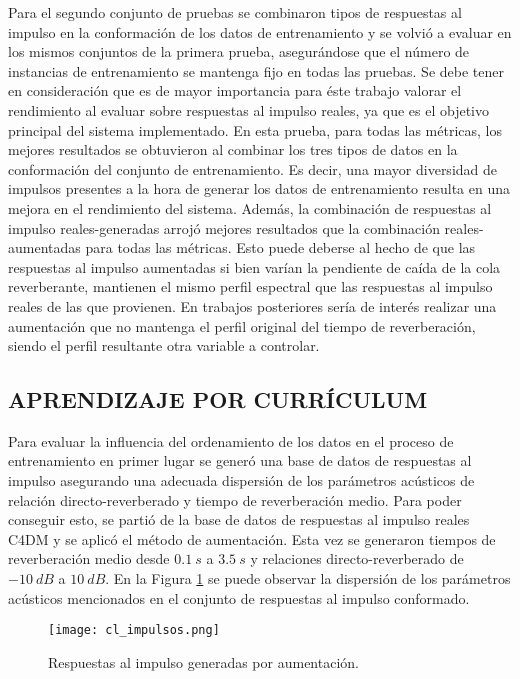Para el segundo conjunto de pruebas se combinaron tipos de respuestas al impulso en la conformación de los datos de entrenamiento y se volvió a evaluar en los mismos conjuntos de la primera prueba, asegurándose que el número de instancias de entrenamiento se mantenga fijo en todas las pruebas. Se debe tener en consideración que es de mayor importancia para éste trabajo valorar el rendimiento al evaluar sobre respuestas al impulso reales, ya que es el objetivo principal del sistema implementado. En esta prueba, para todas las métricas, los mejores resultados se obtuvieron al combinar los tres tipos de datos en la conformación del conjunto de entrenamiento. Es decir, una mayor diversidad de impulsos presentes a la hora de generar los datos de entrenamiento resulta en una mejora en el rendimiento del sistema. Además, la combinación de respuestas al impulso reales-generadas arrojó mejores resultados que la combinación reales-aumentadas para todas las métricas. Esto puede deberse al hecho de que las respuestas al impulso aumentadas si bien varían la pendiente de caída de la cola reverberante, mantienen el mismo perfil espectral que las respuestas al impulso reales de las que provienen. En trabajos posteriores sería de interés realizar una aumentación que no mantenga el perfil original del tiempo de reverberación, siendo el perfil resultante otra variable a controlar. 


\subsection[Aprendizaje por currículum]{APRENDIZAJE POR CURRÍCULUM}
Para evaluar la influencia del ordenamiento de los datos en el proceso de entrenamiento en primer lugar se generó una base de datos de respuestas al impulso asegurando una adecuada dispersión de los parámetros acústicos de relación directo-reverberado y tiempo de reverberación medio. Para poder conseguir esto, se partió de la base de datos de respuestas al impulso reales C4DM y se aplicó el método de aumentación. Esta vez se generaron tiempos de reverberación medio desde $0.1 \ s$ a $3.5 \ s$ y relaciones directo-reverberado de $-10 \ dB$ a $10 \ dB$. En la Figura \ref{fig:cl_impulsos} se puede observar la dispersión de los parámetros acústicos mencionados en el conjunto de respuestas al impulso conformado.

\begin{figure}[H]
	\centering{}
	\texttt{[image: cl\_impulsos.png]}
	\caption{Respuestas al impulso generadas por aumentación.}
	\label{fig:cl_impulsos}
\end{figure}

